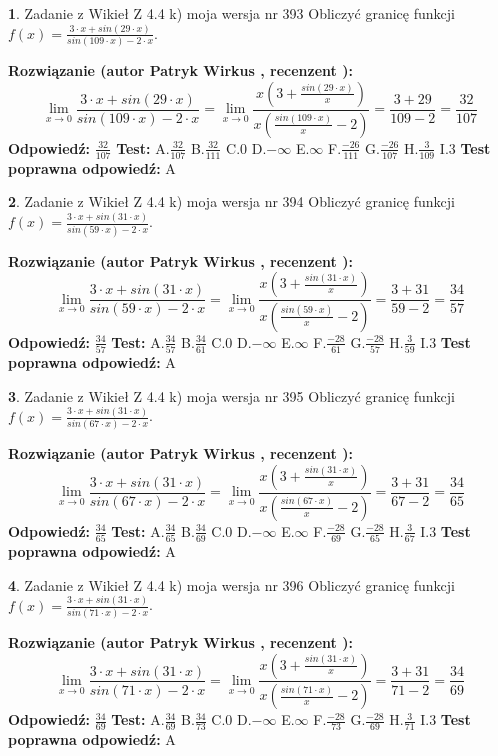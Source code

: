 \documentclass[12pt, a4paper]{article}
\theoremstyle{definition} %
\newtheorem{zad}{}
\newcommand{\zadStart}[1]{\begin{zad}#1\newline}
\newcommand{\zadStop}{\end{zad}}
\newcommand{\rozwStart}[2]{\noindent \textbf{Rozwiązanie (autor #1 , recenzent #2): }\newline}
\newcommand{\rozwStop}{\newline}
\newcommand{\odpStart}{\noindent \textbf{Odpowiedź:}\newline}
\newcommand{\odpStop}{\newline}
\newcommand{\testStart}{\noindent \textbf{Test:}\newline}
\newcommand{\testStop}{\newline}
\newcommand{\kluczStart}{\noindent \textbf{Test poprawna odpowiedź:}\newline}
\newcommand{\kluczStop}{\newline}
\begin{document}
\zadStart{Zadanie z Wikieł Z 4.4 k) moja wersja nr 393}
Obliczyć granicę funkcji $f(x)=\frac{3\cdot x +sin(29\cdot x)}{sin(109\cdot x) -2\cdot x}$.
\zadStop
\rozwStart{Patryk Wirkus}{}
$$\lim\limits_{x\to 0}\frac{3\cdot x +sin(29\cdot x)}{sin(109\cdot x) -2\cdot x}
=\lim\limits_{x\to 0}\frac{x(3+\frac{sin(29\cdot x)}{x})}{x(\frac{sin(109\cdot x)}{x}-2)}
=\frac{3+29}{109-2} = \frac{32}{107}$$
\rozwStop
\odpStart
$\frac{32}{107}$
\odpStop
\testStart
A.$\frac{32}{107}$
B.$\frac{32}{111}$
C.$0$
D.$-\infty$
E.$\infty$
F.$\frac{-26}{111}$
G.$\frac{-26}{107}$
H.$\frac{3}{109}$
I.$3$
\testStop
\kluczStart
A
\kluczStop



\zadStart{Zadanie z Wikieł Z 4.4 k) moja wersja nr 394}
Obliczyć granicę funkcji $f(x)=\frac{3\cdot x +sin(31\cdot x)}{sin(59\cdot x) -2\cdot x}$.
\zadStop
\rozwStart{Patryk Wirkus}{}
$$\lim\limits_{x\to 0}\frac{3\cdot x +sin(31\cdot x)}{sin(59\cdot x) -2\cdot x}
=\lim\limits_{x\to 0}\frac{x(3+\frac{sin(31\cdot x)}{x})}{x(\frac{sin(59\cdot x)}{x}-2)}
=\frac{3+31}{59-2} = \frac{34}{57}$$
\rozwStop
\odpStart
$\frac{34}{57}$
\odpStop
\testStart
A.$\frac{34}{57}$
B.$\frac{34}{61}$
C.$0$
D.$-\infty$
E.$\infty$
F.$\frac{-28}{61}$
G.$\frac{-28}{57}$
H.$\frac{3}{59}$
I.$3$
\testStop
\kluczStart
A
\kluczStop



\zadStart{Zadanie z Wikieł Z 4.4 k) moja wersja nr 395}
Obliczyć granicę funkcji $f(x)=\frac{3\cdot x +sin(31\cdot x)}{sin(67\cdot x) -2\cdot x}$.
\zadStop
\rozwStart{Patryk Wirkus}{}
$$\lim\limits_{x\to 0}\frac{3\cdot x +sin(31\cdot x)}{sin(67\cdot x) -2\cdot x}
=\lim\limits_{x\to 0}\frac{x(3+\frac{sin(31\cdot x)}{x})}{x(\frac{sin(67\cdot x)}{x}-2)}
=\frac{3+31}{67-2} = \frac{34}{65}$$
\rozwStop
\odpStart
$\frac{34}{65}$
\odpStop
\testStart
A.$\frac{34}{65}$
B.$\frac{34}{69}$
C.$0$
D.$-\infty$
E.$\infty$
F.$\frac{-28}{69}$
G.$\frac{-28}{65}$
H.$\frac{3}{67}$
I.$3$
\testStop
\kluczStart
A
\kluczStop



\zadStart{Zadanie z Wikieł Z 4.4 k) moja wersja nr 396}
Obliczyć granicę funkcji $f(x)=\frac{3\cdot x +sin(31\cdot x)}{sin(71\cdot x) -2\cdot x}$.
\zadStop
\rozwStart{Patryk Wirkus}{}
$$\lim\limits_{x\to 0}\frac{3\cdot x +sin(31\cdot x)}{sin(71\cdot x) -2\cdot x}
=\lim\limits_{x\to 0}\frac{x(3+\frac{sin(31\cdot x)}{x})}{x(\frac{sin(71\cdot x)}{x}-2)}
=\frac{3+31}{71-2} = \frac{34}{69}$$
\rozwStop
\odpStart
$\frac{34}{69}$
\odpStop
\testStart
A.$\frac{34}{69}$
B.$\frac{34}{73}$
C.$0$
D.$-\infty$
E.$\infty$
F.$\frac{-28}{73}$
G.$\frac{-28}{69}$
H.$\frac{3}{71}$
I.$3$
\testStop
\kluczStart
A
\kluczStop
\end{document}
